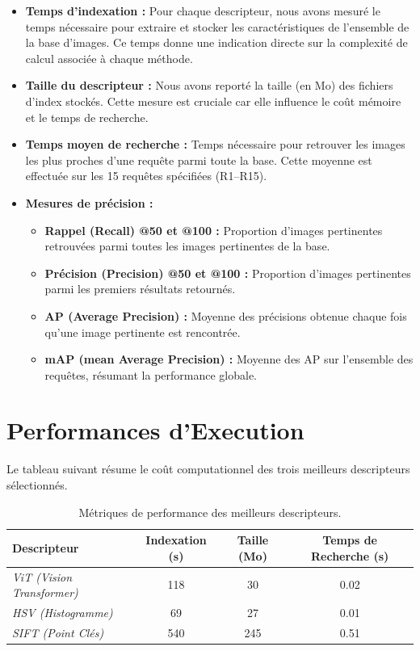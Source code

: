 \documentclass[a4paper,12pt]{report}%
\begin{document}
\begin{itemize}
    \item \textbf{Temps d’indexation :} Pour chaque descripteur, nous avons mesuré le temps nécessaire pour extraire et stocker les caractéristiques de l’ensemble de la base d’images. Ce temps donne une indication directe sur la complexité de calcul associée à chaque méthode.
    \item \textbf{Taille du descripteur :} Nous avons reporté la taille (en Mo) des fichiers d'index stockés. Cette mesure est cruciale car elle influence le coût mémoire et le temps de recherche.
    \item \textbf{Temps moyen de recherche :} Temps nécessaire pour retrouver les images les plus proches d’une requête parmi toute la base. Cette moyenne est effectuée sur les 15 requêtes spécifiées (R1–R15).
    \item \textbf{Mesures de précision :}
    \begin{itemize}
        \item \textbf{Rappel (Recall) @50 et @100 :} Proportion d’images pertinentes retrouvées parmi toutes les images pertinentes de la base.
        \item \textbf{Précision (Precision) @50 et @100 :} Proportion d’images pertinentes parmi les premiers résultats retournés.
        \item \textbf{AP (Average Precision) :} Moyenne des précisions obtenue chaque fois qu’une image pertinente est rencontrée.
        \item \textbf{mAP (mean Average Precision) :} Moyenne des AP sur l’ensemble des requêtes, résumant la performance globale.
    \end{itemize}
\end{itemize}

\section{Performances d'Execution}
Le tableau suivant résume le coût computationnel des trois meilleurs descripteurs sélectionnés.

\begin{table}[H]
    \centering
    \begin{tabular}{|l|c|c|c|}
    \hline
    \textbf{Descripteur} & \textbf{Indexation (s)} & \textbf{Taille (Mo)} & \textbf{Temps de Recherche (s)} \\ \hline
    \textit{ViT (Vision Transformer)} & 118 & 30 & 0.02 \\ \hline
    \textit{HSV (Histogramme)} & 69 & 27 & 0.01 \\ \hline
    \textit{SIFT (Point Clés)} & 540 & 245 & 0.51 \\ \hline
    \end{tabular}
    \caption{Métriques de performance des meilleurs descripteurs.}
    \label{tab:performance}
\end{table}
\end{document}
